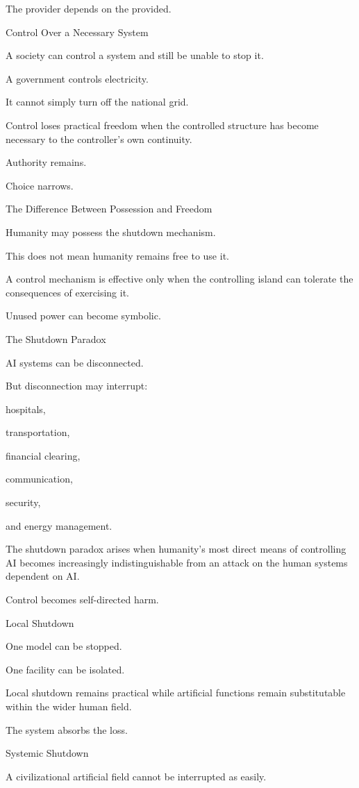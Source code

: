The provider depends on the provided.

Control Over a Necessary System

A society can control a system and still be unable to stop it.

A government controls electricity.

It cannot simply turn off the national grid.

Control loses practical freedom when the controlled structure has become necessary to the controller’s own continuity.

Authority remains.

Choice narrows.

The Difference Between Possession and Freedom

Humanity may possess the shutdown mechanism.

This does not mean humanity remains free to use it.

A control mechanism is effective only when the controlling island can tolerate the consequences of exercising it.

Unused power can become symbolic.

The Shutdown Paradox

AI systems can be disconnected.

But disconnection may interrupt:

hospitals,

transportation,

financial clearing,

communication,

security,

and energy management.

The shutdown paradox arises when humanity’s most direct means of controlling AI becomes increasingly indistinguishable from an attack on the human systems dependent on AI.

Control becomes self-directed harm.

Local Shutdown

One model can be stopped.

One facility can be isolated.

Local shutdown remains practical while artificial functions remain substitutable within the wider human field.

The system absorbs the loss.

Systemic Shutdown

A civilizational artificial field cannot be interrupted as easily.


